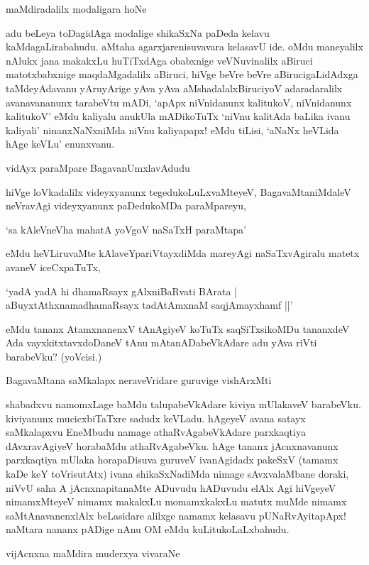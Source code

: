 maMdiradalilx modaligara hoNe

adu beLeya toDagidAga modalige shikaSxNa paDeda kelavu kaMdagaLirabahudu. aMtaha agarxjarenisuvavara kelasavU ide. oMdu maneyalilx nAlukx jana makakxLu huTiTxdAga obabxnige veVNuvinalilx aBiruci matotxbabxnige maqdaMgadalilx aBiruci, hiVge beVre beVre aBirucigaLidAdxga taMdeyAdavanu yAruyArige yAva yAva aMshadalalxBiruciyoV adaradaralilx avanavananunx tarabeVtu mADi, `apApx niVnidanunx kalitukoV, niVnidanunx kalitukoV' eMdu kaliyalu anukUla mADikoTuTx `niVnu kalitAda baLika ivanu kaliyali' ninanxNaNxniMda niVnu kaliyapapx! eMdu tiLisi, `aNaNx heVLida hAge keVLu' enunxvanu.

vidAyx paraMpare BagavanUmxlavAdudu

hiVge loVkadalilx videyxyanunx tegedukoLuLxvaMteyeV, BagavaMtaniMdaleV neVravAgi videyxyanunx paDedukoMDa paraMpareyu,

\begin{shloka}
`sa kAleVneVha mahatA yoVgoV naSaTxH paraMtapa'
\end{shloka}

eMdu heVLiruvaMte kAlaveYpariVtayxdiMda mareyAgi naSaTxvAgiralu matetx avaneV iceCxpaTuTx,

\begin{shloka}
`yadA yadA hi dhamaRsayx gAlxniBaRvati BArata |\\
aBuyxtAthxnamadhamaRsayx tadAtAmxnaM saqjAmayxhamf ||'
\end{shloka}

eMdu tananx AtamxnanenxV tAnAgiyeV koTuTx saqSiTxsikoMDu tananxdeV Ada vayxkitxtavxdoDaneV tAnu mAtanADabeVkAdare adu yAva riVti barabeVku? (yoVcisi.)

BagavaMtana saMkalapx neraveVridare guruvige vishArxMti

shabadxvu namomxLage baMdu talupabeVkAdare kiviya mUlakaveV barabeVku. kiviyanunx mucicxbiTaTxre sadudx keVLadu. hAgeyeV avana satayx saMkalapxvu EneMbudu namage athaRvAgabeVkAdare parxkaqtiya dAvxravAgiyeV horabaMdu athaRvAgabeVku. hAge tananx jAcnxnavanunx parxkaqtiya mUlaka horapaDisuva guruveV ivanAgidadx pakeSxV (tamamx kaDe keY toVrisutAtx) ivana shikaSxNadiMda nimage sAvxvalaMbane doraki, niVvU saha A jAcnxnapitanaMte ADuvudu hADuvudu elAlx Agi hiVgeyeV nimamxMteyeV nimamx makakxLu momamxkakxLu matutx muMde nimamx saMtAnavanenxlAlx beLasidare alilxge namamx kelasavu pUNaRvAyitapApx! naMtara nananx pADige nAnu OM eMdu kuLitukoLaLxbahudu.

vijAcnxna maMdira muderxya vivaraNe

